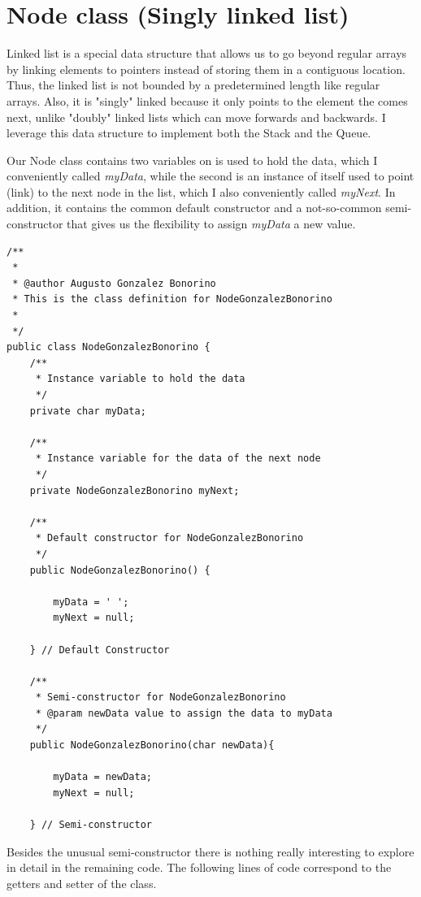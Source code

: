 \documentclass[letterpaper, 10pt]{article}
\begin{document}
\section{Node class (Singly linked list)}

Linked list is a special data structure that allows us to go beyond regular arrays by linking elements to pointers instead of storing them in a contiguous location. Thus, the linked list is not bounded by a predetermined length like regular arrays. Also, it is "singly" linked because it only points to the element the comes next, unlike "doubly" linked lists which can move forwards and backwards. I leverage this data structure to implement both the Stack and the Queue. 

Our Node class contains two variables on is used to hold the data, which I conveniently called \textit{myData}, while the second is an instance of itself used to point (link) to the next node in the list, which I also conveniently called \textit{myNext}. In addition, it contains the common default constructor and a not-so-common semi-constructor that gives us the flexibility to assign \textit{myData} a new value.

\begin{lstlisting}
/**
 * 
 * @author Augusto Gonzalez Bonorino
 * This is the class definition for NodeGonzalezBonorino
 * 
 */
public class NodeGonzalezBonorino {
	/**
	 * Instance variable to hold the data
	 */
	private char myData;
	
	/**
	 * Instance variable for the data of the next node
	 */
	private NodeGonzalezBonorino myNext;
	
	/**
	 * Default constructor for NodeGonzalezBonorino
	 */
	public NodeGonzalezBonorino() {
		
		myData = ' ';
		myNext = null;
		
	} // Default Constructor
	
	/**
	 * Semi-constructor for NodeGonzalezBonorino
	 * @param newData value to assign the data to myData
	 */
	public NodeGonzalezBonorino(char newData){
		
		myData = newData;
		myNext = null;
		
	} // Semi-constructor
\end{lstlisting}

Besides the unusual semi-constructor there is nothing really interesting to explore in detail in the remaining code. The following lines of code correspond to the getters and setter of the class.
\end{document}
